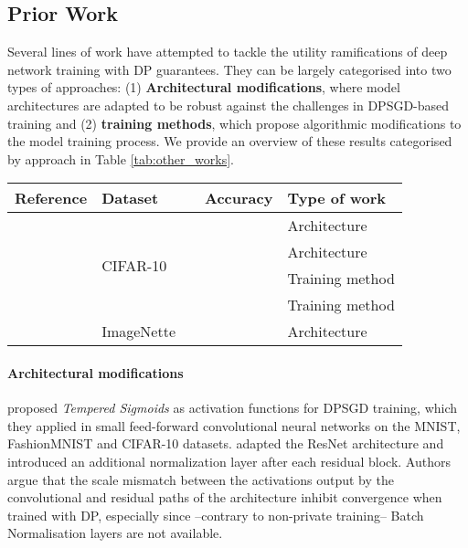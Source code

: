 \documentclass[nohyperref]{article}
\theoremstyle{plain}
\theoremstyle{definition}
\theoremstyle{remark}
\begin{document}
\subsection{Prior Work}
\label{sec:prior_work}
Several lines of work have attempted to tackle the utility ramifications of deep network training with \acl{DP} guarantees. They can be largely categorised into two types of approaches: (1) \textbf{Architectural modifications}, where model architectures are adapted to be robust against the challenges in \acs{DPSGD}-based training and (2) \textbf{training methods}, which propose algorithmic modifications to the model training process. We provide an overview of these results categorised by approach in Table \ref{tab:other_works}. 
\begin{table*}[ht]
    \centering
    \begin{tabular}{@{}lllll@{}}
    \toprule
        Reference & Dataset &  & Accuracy & Type of work \\ \midrule
        \citealt{papernot2020tempered} & \multirow{4}{*}{CIFAR-10} &  &  & Architecture \\
        \citealt{klause2022differentially} & &  &  & Architecture \\
        \citealt{dormann2021not} & &  &  & Training method \\
        \citealt{de2022unlocking} & &  &  & Training method \\ \midrule
        \citealt{klause2022differentially} & ImageNette &  &  & Architecture\\
    \bottomrule
    \end{tabular}
    \caption{Results of other works on the same datasets utilised in our study. \textit{Type of work} refers to the categories specified in Section \ref{sec:prior_work}.}
    \label{tab:other_works}
\end{table*}
\paragraph{Architectural modifications}

\citeauthor{papernot2020tempered} proposed \textit{Tempered Sigmoids} as activation functions for \acs{DPSGD} training, which they applied in small feed-forward convolutional neural networks on the MNIST, FashionMNIST and CIFAR-10 datasets. \citeauthor{klause2022differentially} adapted the ResNet architecture \cite{he2016deep} and introduced an additional normalization layer after each residual block. Authors argue that the scale mismatch between the activations output by the convolutional and residual paths of the architecture inhibit convergence when trained with \acs{DP}, especially since --contrary to non-private training-- Batch Normalisation layers \cite{ioffe2015batch} are not available.
\end{document}
